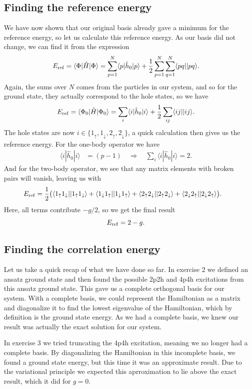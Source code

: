 \documentclass[a4paper, 11pt, notitlepage, english]{article}
\newcommand{\braket}[2]{\langle #1 | #2 \rangle}
\newcommand{\brakket}[2]{\langle #1 || #2 \rangle}
\newcommand{\op}[1]{\hat{#1}}
\newcommand{\braopket}[3]{\langle #1 | {#2} | #3 \rangle}
\renewcommand{\d}{{\rm d}}
\renewcommand{\u}{\uparrow}
\renewcommand{\d}{\downarrow}
\begin{document}
\subsection*{Finding the reference energy}
We have now shown that our original basis already gave a minimum for the reference energy, so let us calculate this reference energy. As our basis did not change, we can find it from the expression
$$E_{\rm ref} = \braopket{\Phi}{\op{H}}{\Phi} = \sum_{p=1}^N \braopket{p}{\op{h}_0}{p} + \frac{1}{2}\sum_{p=1}^N\sum_{q=1}^N\braket{pq|}{pq}.$$
Again, the sums over $N$ comes from the particles in our system, and so for the ground state, they actually correspond to the hole states, so we have
$$E_{\rm ref} = \braopket{\Phi_0}{\op{H}}{\Phi_0} = \sum_{i} \braopket{i}{\op{h}_0}{i} + \frac{1}{2}\sum_{ij} \brakket{ij}{ij}.$$
The hole states are now $i\in\{1_\u, 1_\d, 2_\u, 2_\d \}$, a quick calculation then gives us the reference energy. For the one-body operator we have
\begin{align*}
\braopket{i}{\op{h}_0}{i} &= (p-1) \quad \Rightarrow \quad \sum_{i} \braopket{i}{\op{h}_0}{i} = 2.
\end{align*}
And for the two-body operator, we see that any matrix elements with broken pairs will vanish, leaving us with
\begin{align*}
E_{\rm ref} &=   
\frac{1}{2}\big(
\brakket{1_\u1_\d}{1_\u1_\d} + \brakket{1_\d1_\u}{1_\d1_\u}
+ \brakket{2_\u2_\d}{2_\u2_\d} + \brakket{2_\d2_\u}{2_\d2_\u}
\big).
\end{align*}
Here, all terms contribute $-g/2$, so we get the final result
$$E_{\rm ref} = 2-g.$$

\subsection*{Finding the correlation energy}

Let us take a quick recap of what we have done so far. In exercise 2 we defined an ansatz ground state and then found the possible 2p2h and 4p4h excitations from this ansatz ground state. This gave us a complete orthogonal basis for our system. With a complete basis, we could represent the Hamiltonian as a matrix and diagonalize it to find the lowest eigenvalue of the Hamiltonian, which by definition is the ground state energy. As we had a complete basis, we knew our result was actually the exact solution for our system. 

In exercise 3 we tried truncating the 4p4h excitation, meaning we no longer had a complete basis. By diagonalizing the Hamiltonian in this incomplete basis, we found a ground state energy, but this time it was an approximate result. Due to the variational principle we expected this aprroximation to lie above the exact result, which it did for $g=0$.
\end{document}
